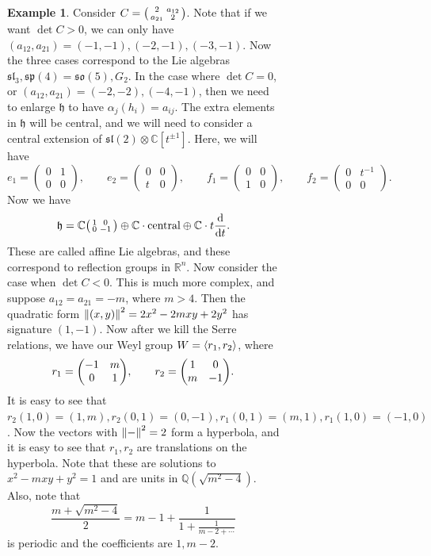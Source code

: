 \documentclass[leqno, openany]{memoir}
\theoremstyle{definition}
\newtheorem{exm}[thm]{Example}
\theoremstyle{remark}
\theoremstyle{plain}
\theoremstyle{definition}
\theoremstyle{remark}
\newcommand{\R}{\mathbb{R}}
\newcommand{\C}{\mathbb{C}}
\newcommand{\Q}{\mathbb{Q}}
\newcommand{\mf}[1]{\mathfrak{#1}}
\begin{document}
\begin{figure}[H]
\begin{figure}[H]
\begin{exm} Consider $C = \begin{psmallmatrix} 2 & a_{12} \\ a_{21} & 2
\end{psmallmatrix}$. Note that if we want $\det C > 0$, we can only have
$(a_{12}, a_{21}) = (-1,-1), (-2,-1), (-3,-1)$. Now the three cases correspond
to the Lie algebras $\mf{sl}_3, \mf{sp}(4) = \mf{so}(5), G_2$. In the case
where $\det C = 0$, or $(a_{12}, a_{21}) = (-2,-2), (-4,-1)$, then we need to
enlarge $\mf{h}$ to have $\alpha_j(h_i) = a_{ij}$. The extra elements in
$\mf{h}$ will be central, and we will need to consider a central extension of
$\mf{sl}(2) \otimes \C[t^{\pm 1}]$. Here, we will have \[ e_1 = \begin{pmatrix}
    0 & 1 \\ 0 & 0 \end{pmatrix}, \qquad e_2 = \begin{pmatrix} 0 & 0 \\ t & 0
    \end{pmatrix}, \qquad f_1 = \begin{pmatrix} 0 & 0 \\ 1 & 0 \end{pmatrix},
    \qquad f_2 = \begin{pmatrix} 0 & t^{-1} \\ 0 & 0 \end{pmatrix}. \] Now we
    have \[ \mf{h} = \C \begin{psmallmatrix} 1 & 0 \\ 0 & -1 \end{psmallmatrix}
\oplus \C \cdot \text{central} \oplus \C \cdot t \dv{t}. \] These are called
affine Lie algebras, and these correspond to reflection groups in $\R^n$. Now
consider the case when $\det C < 0$. This is much more complex, and suppose
$a_{12} = a_{21} = -m$, where $m>4$. Then the quadratic form $\norm{(x,y)}^2 =
2x^2 - 2mxy + 2y^2$ has signature $(1,-1)$. Now after we kill the Serre
relations, we have our Weyl group $W = \ev{r_1, r_2}$, where \[ r_1 = \mqty(-1
& m \\ 0 & 1), \qquad r_2 = \mqty(1 & 0 \\ m & -1). \] It is easy to see that
$r_2 (1,0) = (1,m), r_2 (0,1) = (0,-1), r_1(0,1) = (m,1), r_1(1,0) = (-1,0)$.
Now the vectors with $\norm{-}^2 = 2$ form a hyperbola, and it is easy to see
that $r_1, r_2$ are translations on the hyperbola. Note that these are
solutions to $x^2 - mxy + y^2 = 1$ and are units in $\Q(\sqrt{m^2-4})$. Also,
note that \[ \frac{m+\sqrt{m^2-4}}{2} = m - 1 + \frac{1}{1 + \frac{1}{m-2 +
\cdots}} \] is periodic and the coefficients are $1, m-2$. 


\end{exm}
\end{figure}
\end{figure}
\end{document}
